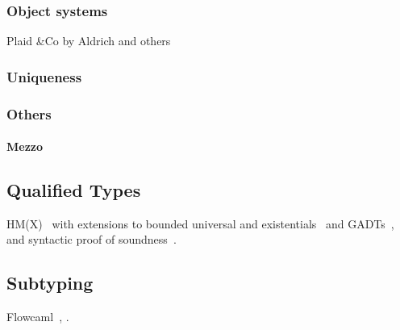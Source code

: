 \subsubsection{Object systems}
\TODO{}

Plaid \&Co by Aldrich and others

\subsubsection{Uniqueness}

\subsubsection{Others}

\paragraph{Mezzo}

\subsection{Qualified Types}

HM(X)~\citep{DBLP:journals/tapos/OderskySW99} with extensions to
bounded universal and existentials~\citep{DBLP:conf/icfp/Simonet03}
and GADTs~\citep{DBLP:journals/toplas/SimonetP07},
and syntactic proof of soundness~\citep{DBLP:journals/entcs/SkalkaP02}.

\subsection{Subtyping}



Flowcaml~\citep{DBLP:conf/popl/PottierS02},
\citet{DBLP:conf/sas/TrifonovS96}.


